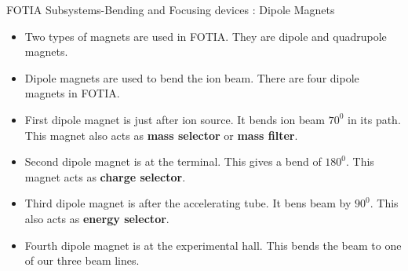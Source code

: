\documentclass[11pt]{beamer}
\begin{document}
\begin{frame}{FOTIA Subsystems-Bending and Focusing devices : Dipole Magnets}

  \begin{itemize}
   
    \item Two types of magnets are used in FOTIA. They are dipole and quadrupole magnets.
    \item Dipole magnets are used to bend the ion beam. There are four dipole magnets in FOTIA.
    \item First dipole magnet is just after ion source. It bends ion beam $70^0$ in its path. This magnet also acts as \textbf{mass selector} or \textbf{mass filter}.
    \item Second dipole magnet is at the terminal. This gives a bend of $180^0$. This magnet acts as \textbf{charge selector}.
    \item Third dipole magnet is after the accelerating tube. It bens beam by $90^0$. This also acts as \textbf{energy selector}.
    \item Fourth dipole magnet is at the experimental hall. This bends the beam to one of our three beam lines.
   
   \end{itemize}

\end{frame}
\end{document}
